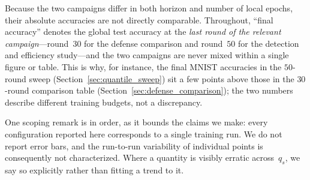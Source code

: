 \documentclass[journal]{IEEEtran}
\begin{document}
Because the two campaigns differ in both horizon and number of local epochs, their absolute accuracies are not directly comparable. Throughout, ``final accuracy'' denotes the global test accuracy at the \emph{last round of the relevant campaign}---round~$30$ for the defense comparison and round~$50$ for the detection and efficiency study---and the two campaigns are never mixed within a single figure or table. This is why, for instance, the final MNIST accuracies in the $50$-round sweep (Section~\ref{sec:quantile_sweep}) sit a few points above those in the $30$-round comparison table (Section~\ref{sec:defense_comparison}); the two numbers describe different training budgets, not a discrepancy.

One scoping remark is in order, as it bounds the claims we make: every configuration reported here corresponds to a single training run. We do not report error bars, and the run-to-run variability of individual points is consequently not characterized. Where a quantity is visibly erratic across~$q_s$, we say so explicitly rather than fitting a trend to it.
\end{document}
